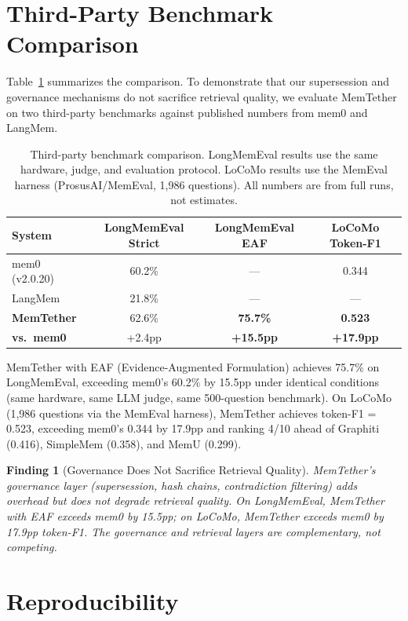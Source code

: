 \documentclass{article}
\newtheorem{finding}{Finding}
\begin{document}
\section{Third-Party Benchmark Comparison}
\label{sec:thirdparty}

Table~\ref{tab:thirdparty} summarizes the comparison. To demonstrate that our supersession and governance mechanisms do not sacrifice retrieval quality, we evaluate MemTether on two third-party benchmarks against published numbers from mem0 and LangMem.

\begin{table}[h]
\centering
\caption{Third-party benchmark comparison. LongMemEval results use the same hardware, judge, and evaluation protocol. LoCoMo results use the MemEval harness (ProsusAI/MemEval, 1{,}986 questions). All numbers are from full runs, not estimates.}
\label{tab:thirdparty}
\begin{tabular}{lccc}
\toprule
System & LongMemEval Strict & LongMemEval EAF & LoCoMo Token-F1 \\
\midrule
mem0 (v2.0.20) & 60.2\% & --- & 0.344 \\
LangMem & 21.8\% & --- & --- \\
\textbf{MemTether} & 62.6\% & \textbf{75.7\%} & \textbf{0.523} \\
\midrule
\textbf{vs.\ mem0} & +2.4pp & \textbf{+15.5pp} & \textbf{+17.9pp} \\
\bottomrule
\end{tabular}
\end{table}

MemTether with EAF (Evidence-Augmented Formulation) achieves 75.7\% on LongMemEval, exceeding mem0's 60.2\% by 15.5pp under identical conditions (same hardware, same LLM judge, same 500-question benchmark). On LoCoMo (1{,}986 questions via the MemEval harness), MemTether achieves token-F1 = 0.523, exceeding mem0's 0.344 by 17.9pp and ranking 4/10 ahead of Graphiti (0.416), SimpleMem (0.358), and MemU (0.299).

\begin{finding}[Governance Does Not Sacrifice Retrieval Quality]
MemTether's governance layer (supersession, hash chains, contradiction filtering) adds overhead but does not degrade retrieval quality. On LongMemEval, MemTether with EAF exceeds mem0 by 15.5pp; on LoCoMo, MemTether exceeds mem0 by 17.9pp token-F1. The governance and retrieval layers are complementary, not competing.
\end{finding}


\section{Reproducibility}
\label{sec:repro}
\end{document}
